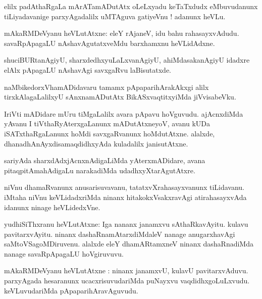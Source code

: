 \documentclass{article}
\begin{document}
\begin{mn}
elilx padAthaRgaLa mArATamADutAtx oLeLxyadu keTaTxdudx eMbuvudanunx tiLiyadavanige parxyAgadalilx 
uMTAguva gatiyeVnu ! adanunx heVLu.
\end{mn}

\begin{mn}
mAkaRMDeVyanu heVLutAtxne: eleY rAjaneV, idu bahu rahasayxvAdudu. savaRpApagaLU nAshavAgutatxveMdu
barxhamxnu heVLidAdxne.
\end{mn}

\begin{mn}
shuciBURtanAgiyU, sharxdedhxyuLaLxvanAgiyU, ahiMdasakanAgiyU idadxre elAlx pApagaLU nAshavAgi 
savxgaRvu laBisutatxde.
\end{mn}

\begin{mn}
naMbikedorxVhamADidavaru tamamx pApaparihArakAkxgi alilx tirxkAlagaLalilxyU sAnxnamADutAtx 
BikASxvaqtitxyiMda jiVvisabeVku.
\end{mn}

\begin{mn}
IriVti mADidare mUru tiMgaLalilx avara pApavu hoVguvudu. ajAcnxdiMda yAvanu I tiVthaRyAterxgaLanunx 
mADutAtxneyoV, avanu kUDa iSATxthaRgaLanunx hoMdi savxgaRvanunx hoMdutAtxne. alalxde, 
dhanadhAnAyxdisamaqdidhxyAda kuladalilx janisutAtxne.
\end{mn}

\begin{mn}
sariyAda sharxdAdxjAcnxnAdigaLiMda yAterxmADidare, avana pitaqpitAmahAdigaLu narakadiMda 
udadhxyXtarAgutAtxre.
\end{mn}

\begin{mn}
niVnu dhamaRvanunx anusarisuvavanu, tatatxvXrahasayxvanunx tiLidavanu. iMtaha niVnu 
keVLidadxriMda ninanx hitakokxVsakxravAgi atirahasayxvAda idanunx ninage heVLidedxVne.
\end{mn}

\begin{mn}
yudhiSiThxranu heVLutAtxne: Iga nananx janamxvu sAthaRkavAyitu. kulavu pavitarxvAyitu. ninanx 
dashaRnamAtarxdiMdaleV nanage anugarxhavAgi saMtoVSagoMDiruvenu. alalxde eleY dhamARtamxneV 
ninanx dashaRnadiMda  nanage savaRpApagaLU hoVgiruvuvu.
\end{mn}

\begin{mn}
mAkaRMDeVyanu heVLutAtxne : ninanx janamxvU, kulavU pavitarxvAduvu. parxyAgada hesaranunx 
ucacxrisuvudariMda puNayxvu vaqdidhxgoLuLxvudu. keVLuvudariMda pApaparihAravAguvudu.
\end{mn}
\end{document}
